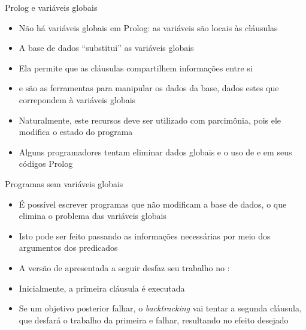 \begin{frame}[fragile]{Prolog e variáveis globais}

    \begin{itemize}
        \item Não há variáveis globais em Prolog: as variáveis são locais às cláusulas

        \item A base de dados ``substitui'' as variáveis globais

        \item Ela permite que as cláusulas compartilhem informações entre si

        \item {} e  são as ferramentas para 
            manipular os dados da base, dados estes que correpondem à variáveis globais

        \item Naturalmente, este recursos deve ser utilizado com parcimônia, pois 
            ele modifica o estado do programa

        \item Alguns programadores tentam eliminar dados globais e o uso de 
             e  em seus códigos Prolog
 
    \end{itemize}

\end{frame}

\begin{frame}[fragile]{Programas sem variáveis globais}

    \begin{itemize}

        \item É possível escrever programas que não modificam a base de dados, o que elimina o 
            problema das variáveis globais

        \item Isto pode ser feito passando as informações necessárias por meio dos argumentos 
            dos predicados

        \item A versão de  apresentada a seguir desfaz seu trabalho no 
            :


        \item Inicialmente, a primeira cláusula é executada

        \item Se um objetivo posterior falhar, o \textit{backtracking} vai tentar a segunda 
            cláusula, que desfará o trabalho da primeira e falhar, resultando no efeito 
            desejado

    \end{itemize}

\end{frame}
